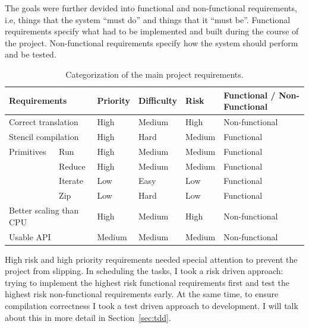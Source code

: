 \documentclass[12pt,a4paper,twoside]{scrbook}
\begin{document}
The goals were further devided into functional and non-functional requirements,
i.e, things that the system ``must do'' and things that it ``must
be''. Functional requirements specify what had to be implemented and built
during the course of the project. Non-functional requirements specify how the
system should perform and be tested.

\begin{table}
\caption{Categorization of the main project requirements.\label{tbl:reqanal}}
\begin{tabular}{|l|l|l|l|l|l|}
\hline
\multicolumn{2}{|l|}{Requirements}                       & Priority & Difficulty & Risk    & Functional / Non-Functional \\
\hline
\multicolumn{2}{|l|}{Correct translation}                & High     & Medium     & High    & Non-functional              \\
\hline
\multicolumn{2}{|l|}{Stencil compilation}                & High     & Hard       & Medium  & Functional                  \\
\hline
Primitives                                    & Run      & High     & Medium     & Medium  & Functional                  \\
\cline{3-6}
                                              & Reduce   & High     & Medium     & Medium  & Functional                  \\
\cline{3-6}
                                              & Iterate  & Low      & Easy       & Low     & Functional                  \\
\cline{3-6}
                                              & Zip      & Low      & Hard       & Low     & Functional                  \\
\hline
\multicolumn{2}{|l|}{Better scaling than CPU}            & High     & Medium     & High    & Non-functional              \\
\hline
\multicolumn{2}{|l|}{Usable API}                         & Medium   & Medium     & Medium  & Non-functional              \\
\hline
\end{tabular}
\end{table}

High risk and high priority requirements needed special attention to prevent the
project from slipping. In scheduling the tasks, I took a risk driven approach:
trying to implement the highest risk functional requirements first and test the
highest risk non-functional requirements early. At the same time, to ensure
compilation correctness I took a test driven approach to development. I will
talk about this in more detail in Section~\ref{sec:tdd}.
\end{document}
